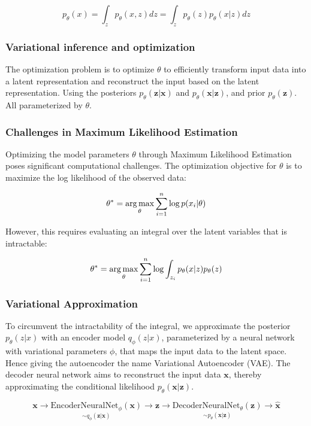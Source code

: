 \begin{equation}
    p_\theta(x) = \int_zp_\theta(x, z) dz= \int_z p_\theta(z)p_\theta(x|z)dz    
\end{equation}

\subsubsection{Variational inference and optimization}
The optimization problem is to optimize $\theta$ to efficiently transform input data into a latent representation and reconstruct the input based on the latent representation.
Using the posteriors $p_\theta(\mathbf{z}|\mathbf{x})$ and $p_\theta(\mathbf{x}|\mathbf{z})$, and prior $p_\theta(\mathbf{z})$. All parameterized by $\theta$.
\subsubsection{Challenges in Maximum Likelihood Estimation}
Optimizing the model parameters \( \theta \) through Maximum Likelihood Estimation poses significant computational challenges. The optimization objective for \( \theta \) is to maximize the log likelihood of the observed data:

\begin{equation}
    \theta^* = \operatorname*{arg\,max}_\theta \sum_{i=1}^n \log p(x_i | \theta)
\end{equation}

However, this requires evaluating an integral over the latent variables that is intractable:

\begin{equation}
    \theta^* = \operatorname*{arg\,max}_\theta \sum_{i=1}^n \log\int_{z_i}p_\theta(x|z)p_\theta(z)
\end{equation}

\subsubsection{Variational Approximation}
To circumvent the intractability of the integral, we approximate the posterior \( p_\theta(z|x) \) with an encoder model \( q_\phi(z|x) \), parameterized by a neural network with variational parameters $\phi$, that maps the input data to the latent space.
Hence giving the autoencoder the name Variational Autoencoder (VAE). The decoder neural network aims to reconstruct the input data $\mathbf{x}$, thereby approximating the conditional likelihood $p_\theta(\mathbf{x}|\mathbf{z})$.

\begin{equation}
    \mathbf{x}\rightarrow \underset{\sim q_\phi(\mathbf{z}|\mathbf{x})}{\text{EncoderNeuralNet}_\phi(\mathbf{x})} \rightarrow \mathbf{z} \rightarrow \underset{\sim p_\theta(\mathbf{x}|\mathbf{z})}{\text{DecoderNeuralNet}_\theta(\mathbf{z})} \rightarrow \hat{\mathbf{x}}
\end{equation}

